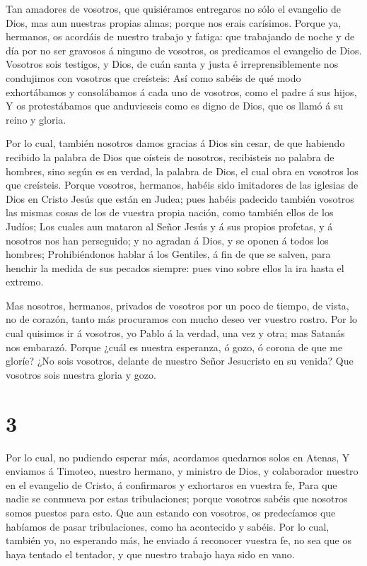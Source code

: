  Tan amadores de vosotros, que quisiéramos entregaros no
sólo el evangelio de Dios, mas aun nuestras propias almas; porque nos
erais carísimos.  Porque ya, hermanos, os acordáis de
nuestro trabajo y fatiga: que trabajando de noche y de día por no ser
gravosos á ninguno de vosotros, os predicamos el evangelio de Dios.
 Vosotros sois testigos, y Dios, de cuán santa y justa é
irreprensiblemente nos condujimos con vosotros que creísteis:
 Así como sabéis de qué modo exhortábamos y consolábamos á
cada uno de vosotros, como el padre á sus hijos,  Y os
protestábamos que anduvieseis como es digno de Dios, que os llamó á su
reino y gloria.

 Por lo cual, también nosotros damos gracias á Dios sin
cesar, de que habiendo recibido la palabra de Dios que oísteis de
nosotros, recibisteis no palabra de hombres, sino según es en verdad, la
palabra de Dios, el cual obra en vosotros los que creísteis.
 Porque vosotros, hermanos, habéis sido imitadores de las
iglesias de Dios en Cristo Jesús que están en Judea; pues habéis
padecido también vosotros las mismas cosas de los de vuestra propia
nación, como también ellos de los Judíos;  Los cuales aun
mataron al Señor Jesús y á sus propios profetas, y á nosotros nos han
perseguido; y no agradan á Dios, y se oponen á todos los hombres;
 Prohibiéndonos hablar á los Gentiles, á fin de que se
salven, para henchir la medida de sus pecados siempre: pues vino sobre
ellos la ira hasta el extremo.

 Mas nosotros, hermanos, privados de vosotros por un poco
de tiempo, de vista, no de corazón, tanto más procuramos con mucho deseo
ver vuestro rostro.  Por lo cual quisimos ir á vosotros, yo
Pablo á la verdad, una vez y otra; mas Satanás nos embarazó.
 Porque ¿cuál es nuestra esperanza, ó gozo, ó corona de que
me gloríe? ¿No sois vosotros, delante de nuestro Señor Jesucristo en su
venida?  Que vosotros sois nuestra gloria y gozo.

\hypertarget{section-2}{%
\section{3}\label{section-2}}

 Por lo cual, no pudiendo esperar más, acordamos quedarnos
solos en Atenas,  Y enviamos á Timoteo, nuestro hermano, y
ministro de Dios, y colaborador nuestro en el evangelio de Cristo, á
confirmaros y exhortaros en vuestra fe,  Para que nadie se
conmueva por estas tribulaciones; porque vosotros sabéis que nosotros
somos puestos para esto.  Que aun estando con vosotros, os
predecíamos que habíamos de pasar tribulaciones, como ha acontecido y
sabéis.  Por lo cual, también yo, no esperando más, he
enviado á reconocer vuestra fe, no sea que os haya tentado el tentador,
y que nuestro trabajo haya sido en vano.

